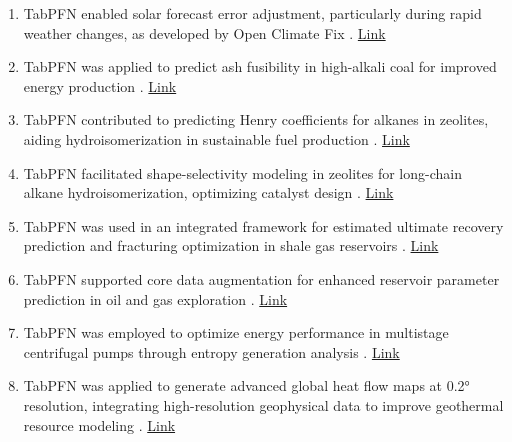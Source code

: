 \begin{enumerate}
\item TabPFN enabled solar forecast error adjustment, particularly during rapid weather changes, as developed by Open Climate Fix \cite{energy_usecase5_solar_adjuster_ocf}. \href{https://gist.github.com/anshulg954/5f4423ee6b3d3151fa8d0d7fcd98d3eb}{Link}

\item TabPFN was applied to predict ash fusibility in high-alkali coal for improved energy production \cite{energy_usecase6_ash_fusibility_high_alkali}. \href{https://papers.ssrn.com/sol3/papers.cfm?abstract_id=5406504}{Link}

\item TabPFN contributed to predicting Henry coefficients for alkanes in zeolites, aiding hydroisomerization in sustainable fuel production \cite{energy_usecase7_henry_zeolites}. \href{https://pubs.acs.org/doi/full/10.1021/acs.jpcc.5c03868}{Link}

\item TabPFN facilitated shape-selectivity modeling in zeolites for long-chain alkane hydroisomerization, optimizing catalyst design \cite{energy_usecase8_shape_selectivity_zeolites}. \href{https://doi.org/10.4233/uuid:f36da034-5cb3-42ca-a53d-d351f68a9ffa}{Link}

\item TabPFN was used in an integrated framework for estimated ultimate recovery prediction and fracturing optimization in shale gas reservoirs \cite{energy_usecase9_shale_eur_fracturing}. \href{https://www.researchgate.net/publication/395761327_Coupling_EUR_Prediction_with_Fracturing_Optimization_An_Integrated_Machine_Learning_Framework_for_Shale_Gas_Development}{Link}

\item TabPFN supported core data augmentation for enhanced reservoir parameter prediction in oil and gas exploration \cite{energy_usecase10_core_augmentation_reservoir}. \href{https://www.researchgate.net/publication/395434405_Enhancing_Reservoir_Parameter_Prediction_Workflows_via_Advanced_Core_Data_Augmentation}{Link}

\item TabPFN was employed to optimize energy performance in multistage centrifugal pumps through entropy generation analysis \cite{energy_usecase11_multistage_pump_tabpfn}. \href{https://www.sciencedirect.com/science/article/abs/pii/S0360544225040411}{Link}

\item TabPFN was applied to generate advanced global heat flow maps at 0.2° resolution, integrating high-resolution geophysical data to improve geothermal resource modeling \cite{energy_usecase13_global_heatflow_02}. \href{https://www.researchgate.net/publication/396728153_The_First_02_Resolution_Global_Continental_Heat_Flow_Map_Advancing_Fine-Scale_Geothermal_Modeling}{Link}


\end{enumerate}
